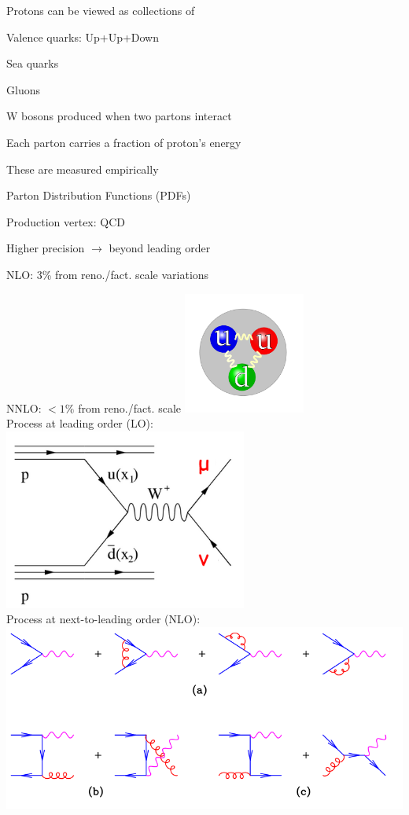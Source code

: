 {
\colb[T]
\centering
\iteb
\item Protons can be viewed as collections of 
\iteb
\item Valence quarks: Up+Up+Down
\item Sea quarks
\item Gluons
\itee
\item W bosons produced when two partons interact
\item Each parton carries a fraction of proton's energy
\iteb
\item These are measured empirically
\item Parton Distribution Functions (PDFs)
\itee
\item Production vertex:  QCD
\iteb
\item Higher precision $\rightarrow$ beyond leading order
\item NLO: 3\% from reno./fact. scale variations
\item NNLO: $<1\%$ from reno./fact. scale
\itee
\itee
{}
\centering
\includegraphics[width=0.3\textwidth]{dates/mtg/figures/wz/proton} \\
\tiny{ Process at leading order (LO): } \\
\includegraphics[width=0.6\textwidth]{dates/mtg/figures/wz/wmunuf} \\
\tiny{ Process at next-to-leading order (NLO): } \\
\includegraphics[width=1.0\textwidth]{dates/mtg/figures/wz/nlo} \\
\cole
}


